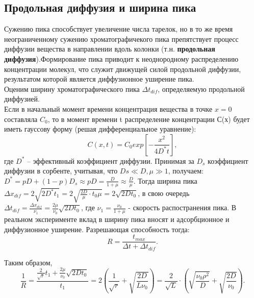 \documentclass[12pt]{article}
\begin{document}
\begin{flushleft}
\subsection{Продольная диффузия и ширина пика}
Сужению пика способствует увеличение числа тарелок, но в то же время неограниченному сужению хроматографичекого пика препятствует процесс
диффузии вещества в направлении вдоль колонки (т.н. \textbf{продольная диффузия}).Формирование пика приводит к неоднородному распределению концентрации молекул,
что служит движущей силой продольной диффузии, результатом которой является
диффузионное уширение пика.\\
Оценим ширину хроматографического пика
$\Delta t_{dif}$, определяемую продольной диффузией. \\
Если в
начальный момент времени концентрация вещества в точке $x = 0$ составляла $C_0$, то в
момент времени t распределение концентрации С(х) будет иметь гауссову форму (решая дифференциальное уравнение): 
\begin{equation}
C(x,t) = C_0exp\left[-\frac{x^2}{4D^*t}\right],
\end{equation}
где $D^*$ -- эффективный коэффициент диффузии. Принимая за $D_s$ коэффициент диффузии в сорбенте, учитывая, что $Ds \ll D, \mu \gg 1$, получаем: $D^* = pD + (1 - p)D_s \approx pD = \frac{D}{1 + \mu} \approx \frac{D}{\mu}$. Тогда ширина пика $\Delta x_{dif} = 2\sqrt{2D^*t_1} = 2\sqrt{\frac{2D}{\mu}\cdot t_0\mu} = 2\sqrt{2Dt_0}$, в свою очередь $\Delta t_{dif} = \frac{\Delta x_{dif}}{\nu_1} = \frac{2\mu}{\nu_0}\sqrt{2Dt_0}$, где $\nu_1 = \frac{\nu_0}{1 + \mu}$ - скорость распостранения пика. В реальном эксперименте вклад в ширину пика вносят и адсорбционное и диффузионное уширение. Разрешающая способность тогда:
\begin{equation}
R = \frac{t_{max}}{\Delta t + \Delta t_{dif}}.
\end{equation}

Таким образом,
\begin{equation}
\frac{1}{R} = \frac{\frac{2}{\sqrt{r}}t_1 + \frac{2\mu}{\nu_0}\sqrt{2Dt_0}}{t_1} = 2(\frac{1}{\sqrt{r}} + \sqrt{\frac{2D}{L\nu_0}}) = \frac{2}{\sqrt{L}}\cdot\left(\sqrt{\frac{\nu_0\rho^2}{D}} + \sqrt{\frac{2D}{\nu_0}}\right). 
\end{equation}


\end{flushleft}
\end{document}
